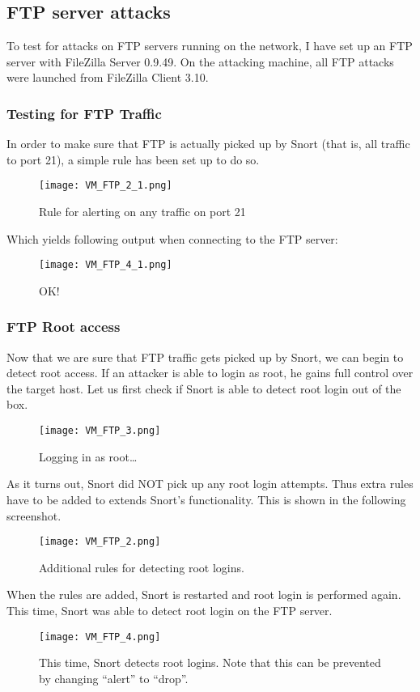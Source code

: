 \subsection{FTP server attacks}

To test for attacks on FTP servers running on the network, I have set up an FTP server with FileZilla Server 0.9.49. On the attacking machine, all FTP attacks were launched from FileZilla Client 3.10.

\subsubsection{Testing for FTP Traffic}

In order to make sure that FTP is actually picked up by Snort (that is, all traffic to port 21), a simple rule has been set up to do so.
\begin{figure}[h]
    \centering
    \texttt{[image: VM\_FTP\_2\_1.png]}
    \caption{Rule for alerting on any traffic on port 21}
\end{figure}
Which yields following output when connecting to the FTP server:
\begin{figure}[h]
    \centering
    \texttt{[image: VM\_FTP\_4\_1.png]}
    \caption{OK!}
\end{figure}

\subsubsection{FTP Root access}

Now that we are sure that FTP traffic gets picked up by Snort, we can begin to detect root access. If an attacker is able to login as root, he gains full control over the target host. Let us first check if Snort is able to detect root login out of the box.
\begin{figure}[h]
    \centering
    \texttt{[image: VM\_FTP\_3.png]}
    \caption{Logging in as root\ldots}
\end{figure}
As it turns out, Snort did NOT pick up any root login attempts. Thus extra rules have to be added to extends Snort's functionality. This is shown in the following screenshot.

\clearpage

\begin{figure}[h]
    \centering
    \texttt{[image: VM\_FTP\_2.png]}
    \caption{Additional rules for detecting root logins.}
\end{figure}
When the rules are added, Snort is restarted and root login is performed again. This time, Snort was able to detect root login on the FTP server.
\begin{figure}[h]
    \centering
    \texttt{[image: VM\_FTP\_4.png]}
    \caption{This time, Snort detects root logins. Note that this can be prevented by changing ``alert'' to ``drop''.}
\end{figure}

